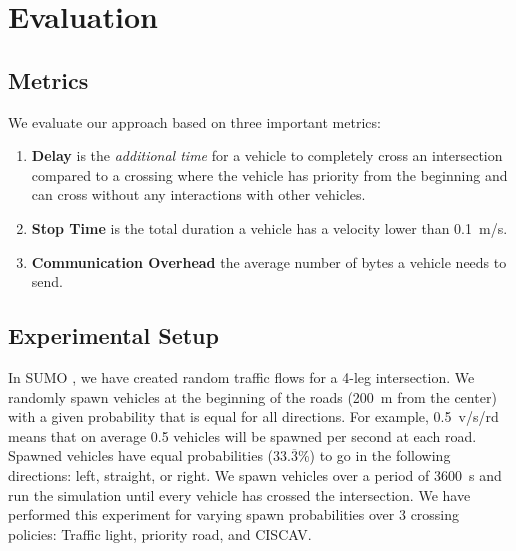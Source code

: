 \section{Evaluation}\label{sec:evaluation}

\subsection{Metrics}\label{sec:metrics}

We evaluate our approach based on three important metrics: 
\begin{enumerate}
	\item \textbf{Delay} is the \emph{additional time} for a vehicle to completely cross an intersection compared to a crossing where the vehicle has priority from the beginning and can cross without any interactions with other vehicles.
	\item \textbf{Stop Time} is the total duration a vehicle has a velocity lower than \SI{0.1}{m/s}.
	\item \textbf{Communication Overhead} the average number of bytes a vehicle needs to send.
\end{enumerate}



\subsection{Experimental Setup}\label{sec:setup}

In SUMO \cite{sumo}, we have created random traffic flows for a 4-leg intersection. We randomly spawn vehicles at the beginning of the roads (\SI{200}{m} from the center) with a given probability that is equal for all directions. For example, \SI{0.5}{v/s/rd} means that on average 0.5 vehicles will be spawned per second at each road. Spawned vehicles have equal probabilities ($33.\overline{3}$\%) to go in the following directions: left, straight, or right. We spawn vehicles over a period of \SI{3600}{s} and run the simulation until every vehicle has crossed the intersection. 
We have performed this experiment for varying spawn probabilities over 3 crossing policies: Traffic light, priority road, and CISCAV. 
